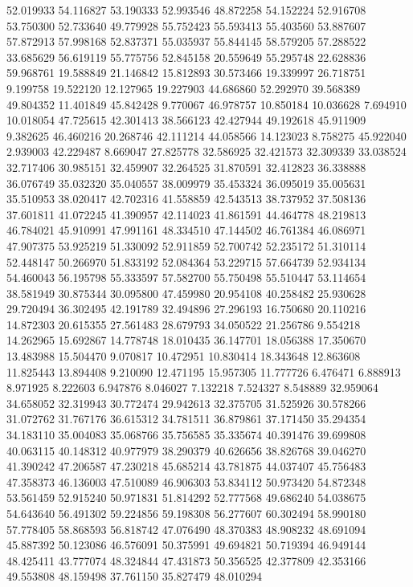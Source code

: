 52.019933
54.116827
53.190333
52.993546
48.872258
54.152224
52.916708
53.750300
52.733640
49.779928
55.752423
55.593413
55.403560
53.887607
57.872913
57.998168
52.837371
55.035937
55.844145
58.579205
57.288522
33.685629
56.619119
55.775756
52.845158
20.559649
55.295748
22.628836
59.968761
19.588849
21.146842
15.812893
30.573466
19.339997
26.718751
9.199758
19.522120
12.127965
19.227903
44.686860
52.292970
39.568389
49.804352
11.401849
45.842428
9.770067
46.978757
10.850184
10.036628
7.694910
10.018054
47.725615
42.301413
38.566123
42.427944
49.192618
45.911909
9.382625
46.460216
20.268746
42.111214
44.058566
14.123023
8.758275
45.922040
2.939003
42.229487
8.669047
27.825778
32.586925
32.421573
32.309339
33.038524
32.717406
30.985151
32.459907
32.264525
31.870591
32.412823
36.338888
36.076749
35.032320
35.040557
38.009979
35.453324
36.095019
35.005631
35.510953
38.020417
42.702316
41.558859
42.543513
38.737952
37.508136
37.601811
41.072245
41.390957
42.114023
41.861591
44.464778
48.219813
46.784021
45.910991
47.991161
48.334510
47.144502
46.761384
46.086971
47.907375
53.925219
51.330092
52.911859
52.700742
52.235172
51.310114
52.448147
50.266970
51.833192
52.084364
53.229715
57.664739
52.934134
54.460043
56.195798
55.333597
57.582700
55.750498
55.510447
53.114654
38.581949
30.875344
30.095800
47.459980
20.954108
40.258482
25.930628
29.720494
36.302495
42.191789
32.494896
27.296193
16.750680
20.110216
14.872303
20.615355
27.561483
28.679793
34.050522
21.256786
9.554218
14.262965
15.692867
14.778748
18.010435
36.147701
18.056388
17.350670
13.483988
15.504470
9.070817
10.472951
10.830414
18.343648
12.863608
11.825443
13.894408
9.210090
12.471195
15.957305
11.777726
6.476471
6.888913
8.971925
8.222603
6.947876
8.046027
7.132218
7.524327
8.548889
32.959064
34.658052
32.319943
30.772474
29.942613
32.375705
31.525926
30.578266
31.072762
31.767176
36.615312
34.781511
36.879861
37.171450
35.294354
34.183110
35.004083
35.068766
35.756585
35.335674
40.391476
39.699808
40.063115
40.148312
40.977979
38.290379
40.626656
38.826768
39.046270
41.390242
47.206587
47.230218
45.685214
43.781875
44.037407
45.756483
47.358373
46.136003
47.510089
46.906303
53.834112
50.973420
54.872348
53.561459
52.915240
50.971831
51.814292
52.777568
49.686240
54.038675
54.643640
56.491302
59.224856
59.198308
56.277607
60.302494
58.990180
57.778405
58.868593
56.818742
47.076490
48.370383
48.908232
48.691094
45.887392
50.123086
46.576091
50.375991
49.694821
50.719394
46.949144
48.425411
43.777074
48.324844
47.431873
50.356525
42.377809
42.353166
49.553808
48.159498
37.761150
35.827479
48.010294
